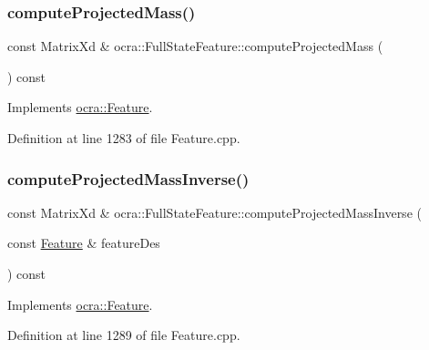 \subsubsection{\texorpdfstring{compute\+Projected\+Mass()}{computeProjectedMass()}\hspace{0.1cm}{\footnotesize\ttfamily [2/2]}}
{\footnotesize\ttfamily const Matrix\+Xd \& ocra\+::\+Full\+State\+Feature\+::compute\+Projected\+Mass (\begin{DoxyParamCaption}{ }\end{DoxyParamCaption}) const\hspace{0.3cm}{\ttfamily [virtual]}}



Implements \hyperlink{classocra_1_1Feature_a99ac023809c0cf34b5d582537934b08c}{ocra\+::\+Feature}.



Definition at line 1283 of file Feature.\+cpp.

\hypertarget{classocra_1_1FullStateFeature_a53b841962a372665dbd0ec7a94c4cd74}{}\label{classocra_1_1FullStateFeature_a53b841962a372665dbd0ec7a94c4cd74} 
\subsubsection{\texorpdfstring{compute\+Projected\+Mass\+Inverse()}{computeProjectedMassInverse()}\hspace{0.1cm}{\footnotesize\ttfamily [1/2]}}
{\footnotesize\ttfamily const Matrix\+Xd \& ocra\+::\+Full\+State\+Feature\+::compute\+Projected\+Mass\+Inverse (\begin{DoxyParamCaption}\item[{const \hyperlink{classocra_1_1Feature}{Feature} \&}]{feature\+Des }\end{DoxyParamCaption}) const\hspace{0.3cm}{\ttfamily [virtual]}}



Implements \hyperlink{classocra_1_1Feature_ac529096b3fe8eba1ab88a56d8b042d37}{ocra\+::\+Feature}.



Definition at line 1289 of file Feature.\+cpp.

\hypertarget{classocra_1_1FullStateFeature_a1b3231544c745efacc3665f567bb4402}{}\label{classocra_1_1FullStateFeature_a1b3231544c745efacc3665f567bb4402} 
